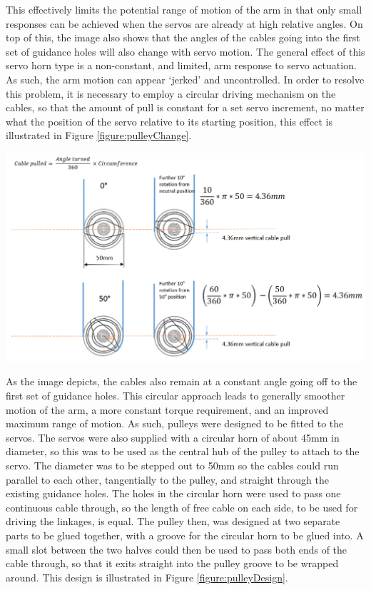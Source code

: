 \documentclass[11pt]{article}
\begin{document}
This effectively limits the potential range of motion of the arm in that only small responses can be achieved when the servos are already at high relative angles. On top of this, the image also shows that the angles of the cables going into the first set of guidance holes will also change with servo motion. The general effect of this servo horn type is a non-constant, and limited, arm response to servo actuation. As such, the arm motion can appear `jerked' and uncontrolled. In order to resolve this problem, it is necessary to employ a circular driving mechanism on the cables, so that the amount of pull is constant for a set servo increment, no matter what the position of the servo relative to its starting position, this effect is illustrated in Figure \ref{figure:pulleyChange}.
 
\begin{center}
\includegraphics[width=\textwidth]{images/pulleyChange.png}
\label{figure:pulleyChange}
\end{center}
 

As the image depicts, the cables also remain at a constant angle going off to the first set of guidance holes. This circular approach leads to generally smoother motion of the arm, a more constant torque requirement, and an improved maximum range of motion. As such, pulleys were designed to be fitted to the servos. The servos were also supplied with a circular horn of about 45mm in diameter, so this was to be used as the central hub of the pulley to attach to the servo. The diameter was to be stepped out to 50mm so the cables could run parallel to each other, tangentially to the pulley, and straight through the existing guidance holes. The holes in the circular horn were used to pass one continuous cable through, so the length of free cable on each side, to be used for driving the linkages, is equal. The pulley then, was designed at two separate parts to be glued together, with a groove for the circular horn to be glued into. A small slot between the two halves could then be used to pass both ends of the cable through, so that it exits straight into the pulley groove to be wrapped around. This design is illustrated in Figure \ref{figure:pulleyDesign}.
\end{document}

